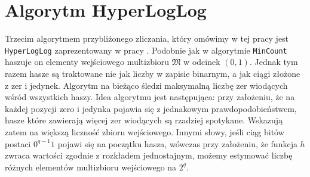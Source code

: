 \section{Algorytm HyperLogLog}

Trzecim algorytmem przybliżonego zliczania, który omówimy w tej pracy jest \texttt{HyperLogLog} zaprezentowany w pracy \cite{hll}. Podobnie jak w algorytmie \texttt{MinCount}  haszuje on elementy wejściowego  multizbioru $\mathfrak{M}$ w odcinek $(0,1)$. Jednak tym razem hasze są traktowane nie jak liczby w zapisie binarnym, a jak ciągi złożone z zer i jedynek. Algorytm na bieżąco śledzi maksymalną liczbę zer wiodących wśród wszystkich haszy. Idea algorytmu jest następująca: przy założeniu, że na każdej pozycji zero i jedynka pojawia się z jednakowym prawdopodobieństwem,  hasze które zawierają więcej zer wiodących są rzadziej spotykane. Wskazują zatem na większą liczność zbioru wejściowego. Innymi słowy, jeśli ciąg bitów postaci $0^{q-1}1$ pojawi się na początku hasza, wówczas przy założeniu, że funkcja $h$ zwraca wartości zgodnie z rozkładem jednostajnym, możemy estymować liczbę różnych elementów multizbioru wejściowego na $2^{q}$.

